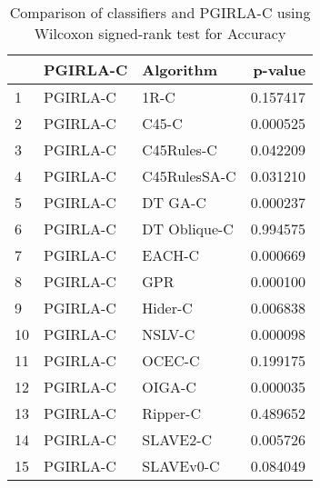 \begin{table}
\footnotesize
\caption{Comparison of classifiers and PGIRLA-C using Wilcoxon signed-rank test for Accuracy}
\label{tab:PGIRLA-C wilcoxon Accuracy comparison}
\begin{tabular}{lllr}
\hline
 & PGIRLA-C & Algorithm & p-value \\
\hline
1 & PGIRLA-C & 1R-C & 0.157417 \\
2 & PGIRLA-C & C45-C & 0.000525 \\
3 & PGIRLA-C & C45Rules-C & 0.042209 \\
4 & PGIRLA-C & C45RulesSA-C & 0.031210 \\
5 & PGIRLA-C & DT GA-C & 0.000237 \\
6 & PGIRLA-C & DT Oblique-C & 0.994575 \\
7 & PGIRLA-C & EACH-C & 0.000669 \\
8 & PGIRLA-C & GPR & 0.000100 \\
9 & PGIRLA-C & Hider-C & 0.006838 \\
10 & PGIRLA-C & NSLV-C & 0.000098 \\
11 & PGIRLA-C & OCEC-C & 0.199175 \\
12 & PGIRLA-C & OIGA-C & 0.000035 \\
13 & PGIRLA-C & Ripper-C & 0.489652 \\
14 & PGIRLA-C & SLAVE2-C & 0.005726 \\
15 & PGIRLA-C & SLAVEv0-C & 0.084049 \\
\hline
\end{tabular}
\end{table}
